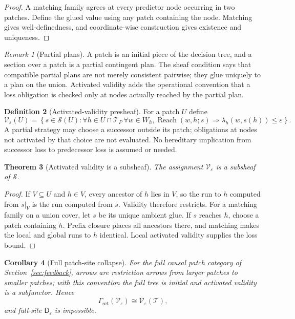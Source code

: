 \documentclass[11pt]{article}
\theoremstyle{plain}
\newtheorem{theorem}{Theorem}[section]
\newtheorem{corollary}[theorem]{Corollary}
\theoremstyle{definition}
\newtheorem{definition}[theorem]{Definition}
\theoremstyle{remark}
\newtheorem{remark}[theorem]{Remark}
\newcommand{\eps}{\varepsilon}
\begin{document}
\begin{proof}
A matching family agrees at every predictor node occurring in two patches.
Define the glued value using any patch containing the node. Matching gives
well-definedness, and coordinate-wise construction gives existence and
uniqueness.
\end{proof}

\begin{remark}[Partial plans]
A patch is an initial piece of the decision tree, and a section over a patch is a
partial contingent plan. The sheaf condition says that compatible partial plans
are not merely consistent pairwise; they glue uniquely to a plan on the union.
Activated validity adds the operational convention that a loss obligation is
checked only at nodes actually reached by the partial plan.
\end{remark}

\begin{definition}[Activated-validity presheaf]\label{def:activated}
For a patch $U$ define
\[
\mathscr V_\eps(U)=
\left\{s\in\mathscr S(U):
\forall h\in U\cap \mathcal T_P\,\forall w\in W_h,
\operatorname{Reach}(w,h;s)
\Rightarrow
\lambda_h(w,s(h))\le\eps
\right\}.
\]
A partial strategy may choose a successor outside its patch; obligations at
nodes not activated by that choice are not evaluated. No hereditary implication
from successor loss to predecessor loss is assumed or needed.
\end{definition}

\begin{theorem}[Activated validity is a subsheaf]\label{thm:activated-sheaf}
The assignment $\mathscr V_\eps$ is a subsheaf of $\mathscr S$.
\end{theorem}

\begin{proof}
If $V\subseteq U$ and $h\in V$, every ancestor of $h$ lies in $V$, so the run
to $h$ computed from $s|_V$ is the run computed from $s$. Validity therefore
restricts. For a matching family on a union cover, let $s$ be its unique ambient
glue. If $s$ reaches $h$, choose a patch containing $h$. Prefix closure places
all ancestors there, and matching makes the local and global runs to $h$
identical. Local activated validity supplies the loss bound.
\end{proof}

\begin{corollary}[Full patch-site collapse]\label{cor:patch-collapse}
For the full causal patch category of Section~\ref{sec:feedback}, arrows are
restriction arrows from larger patches to smaller patches; with this convention
the full tree is initial and activated validity is a subfunctor. Hence
\[
\Gamma_{\mathrm{set}}(\mathscr V_\eps)
\cong\mathscr V_\eps(\mathcal T),
\]
and full-site $\mathsf D_\eps$ is impossible.
\end{corollary}
\end{document}
